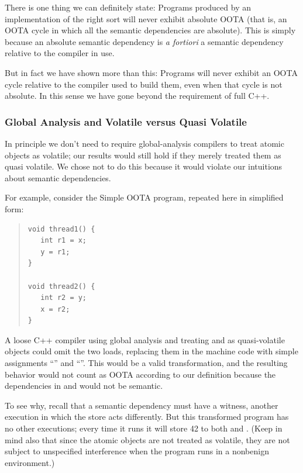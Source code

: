 \documentclass[10]{article}
\begin{document}
There is one thing we can definitely state:
Programs produced by an implementation of the right sort will never
exhibit absolute OOTA (that is, an OOTA cycle in which all the
semantic dependencies are absolute).
This is simply because an absolute semantic dependency is {\it
a fortiori\/} a semantic dependency relative to the compiler in use.

But in fact we have shown more than this:
Programs will never exhibit an OOTA cycle relative to the compiler
used to build them, even when that cycle is not absolute.
In this sense we have gone beyond the requirement of full C++.

\subsubsection{Global Analysis and Volatile versus Quasi Volatile}
\label{sec:Global Analysis and Volatile versus Quasi Volatile}

In principle we don't need to require global-analysis compilers to
treat atomic objects as volatile; our results would still hold if they
merely treated them as quasi volatile.
We chose not to do this because it would violate our intuitions about
semantic dependencies.

For example, consider the Simple OOTA program, repeated here in
simplified form:
\begin{quote}
\begin{verbatim}
void thread1() {
   int r1 = x;
   y = r1;
}

void thread2() {
   int r2 = y;
   x = r2;
}
\end{verbatim}
\end{quote}
A loose C++ compiler using global analysis and treating  and  as
quasi-volatile objects could omit the two loads, replacing them in the
machine code with simple assignments ``'' and
``''.
This would be a valid transformation, and the resulting behavior would
not count as OOTA according to our definition because the
dependencies in  and  would not be semantic.

To see why, recall that a semantic dependency must have a witness,
another execution in which the store acts differently.
But this transformed program has no other executions; every time it
runs it will store 42 to both  and .
(Keep in mind also that since the atomic objects are not treated as
volatile, they are not subject to unspecified interference when the
program runs in a nonbenign environment.)
\end{document}
